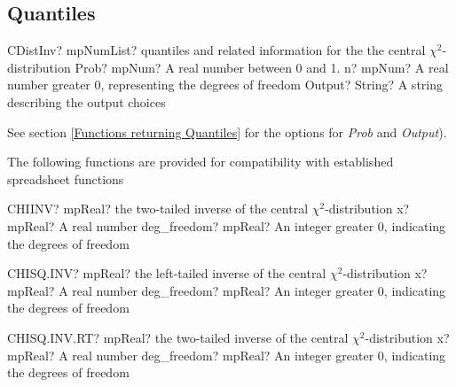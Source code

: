 \subsection{Quantiles}
\label{ChiSquareDistributionQuantiles}


\begin{mpFunctionsExtract}
	\mpFunctionThreeNotImplemented
	{CDistInv? mpNumList? quantiles and related information for the the central $\chi^2$-distribution}
	{Prob? mpNum? A real number between 0 and 1.}
	{n? mpNum? A real number greater 0, representing the degrees of freedom}
	{Output? String? A string describing the output choices}
\end{mpFunctionsExtract}

See section \ref{Functions returning Quantiles} for the options for  {\itshape\sffamily Prob} and {\itshape\sffamily Output}). 

\vspace{0.3cm}

The following functions are provided for compatibility with established spreadsheet functions

\vspace{0.3cm}
\begin{mpFunctionsExtract}
	\mpWorksheetFunctionTwoNotImplemented
	{CHIINV? mpReal? the two-tailed inverse of the central $\chi^2$-distribution}
	{x? mpReal? A real number}
	{deg\_freedom? mpReal? An integer  greater 0, indicating the degrees of freedom}
\end{mpFunctionsExtract}

\vspace{0.6cm}
\begin{mpFunctionsExtract}
	\mpWorksheetFunctionTwoNotImplemented
	{CHISQ.INV? mpReal? the left-tailed inverse of the central $\chi^2$-distribution}
	{x? mpReal? A real number}
	{deg\_freedom? mpReal? An integer  greater 0, indicating the degrees of freedom}
\end{mpFunctionsExtract}

\vspace{0.6cm}
\begin{mpFunctionsExtract}
	\mpWorksheetFunctionTwoNotImplemented
	{CHISQ.INV.RT? mpReal? the two-tailed inverse of the central $\chi^2$-distribution}
	{x? mpReal? A real number}
	{deg\_freedom? mpReal? An integer  greater 0, indicating the degrees of freedom}
\end{mpFunctionsExtract}

